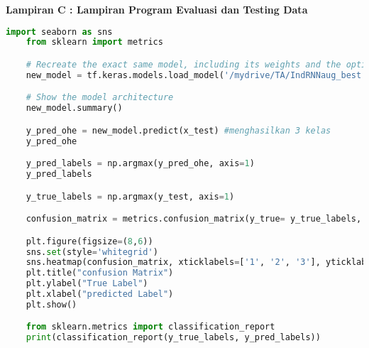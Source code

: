 \textbf{Lampiran C : Lampiran Program Evaluasi dan Testing Data}
\begin{lstlisting}[language=Python]
    import seaborn as sns
    from sklearn import metrics

    # Recreate the exact same model, including its weights and the optimizer
    new_model = tf.keras.models.load_model('/mydrive/TA/IndRNNaug_best.h5', custom_objects={'IndRNN':IndRNN})

    # Show the model architecture
    new_model.summary()

    y_pred_ohe = new_model.predict(x_test) #menghasilkan 3 kelas
    y_pred_ohe 

    y_pred_labels = np.argmax(y_pred_ohe, axis=1)
    y_pred_labels

    y_true_labels = np.argmax(y_test, axis=1)

    confusion_matrix = metrics.confusion_matrix(y_true= y_true_labels, y_pred= y_pred_labels)

    plt.figure(figsize=(8,6))
    sns.set(style='whitegrid')
    sns.heatmap(confusion_matrix, xticklabels=['1', '2', '3'], yticklabels=['1', '2', '3'], annot=True, fmt='d')
    plt.title("confusion Matrix")
    plt.ylabel("True Label")
    plt.xlabel("predicted Label")
    plt.show()

    from sklearn.metrics import classification_report
    print(classification_report(y_true_labels, y_pred_labels))
\end{lstlisting}
